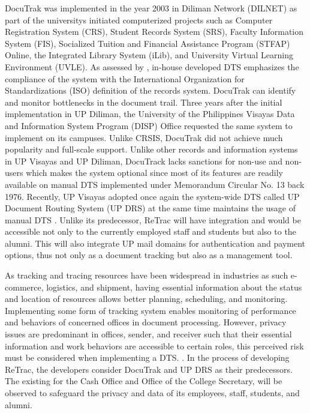 DocuTrak was implemented in the year 2003 in Diliman Network (DILNET) as part of the university\textsc{}s initiated computerized projects such as Computer Registration System (CRS), Student Records System (SRS), Faculty Information System (FIS), Socialized Tuition and Financial Assistance Program (STFAP) Online, the Integrated Library System (iLib), and University Virtual Learning Environment (UVLE). As assessed by , in-house developed DTS emphasizes the compliance of the system with the International Organization for Standardizations (ISO) definition of the records system. DocuTrak can identify and monitor bottlenecks in the document trail. Three years after the initial implementation in UP Diliman, the University of the Philippines Visayas Data and Information System Program (DISP) Office requested the same system to implement on its campuses. Unlike CRSIS, DocuTrak did not achieve much popularity and full-scale support. Unlike other records and information systems in UP Visayas and UP Diliman, DocuTrack lacks sanctions for non-use and non-users which makes the system optional since most of its features are readily available on manual DTS  implemented under Memorandum Circular No. 13 back 1976. Recently, UP Visayas adopted once again the system-wide DTS called UP Document Routing System (UP DRS) at the same time maintains the usage of manual DTS \cite{camposano_2020}. Unlike its predecessor, ReTrac will have integration and would be accessible not only to the currently employed staff and students but also to the alumni. This will also integrate UP mail domains for authentication and payment options, thus not only as a document tracking but also as a management tool. 


As tracking and tracing resources have been widespread in industries as such e-commerce, logistics, and shipment, having essential information about the status and location of resources allows better planning, scheduling, and monitoring. Implementing some form of tracking system enables monitoring of performance and behaviors of concerned offices in document processing. However, privacy issues are predominant in offices, sender, and receiver such that their essential information and work behaviors are accessible to certain roles, this perceived risk must be considered when implementing a DTS. \cite{perception_tracking}. In the process of developing ReTrac, the developers consider DocuTrak and UP DRS as their predecessors. The existing  for the Cash Office and Office of the College Secretary,  will be observed to safeguard the privacy and data of its employees, staff, students, and alumni.

